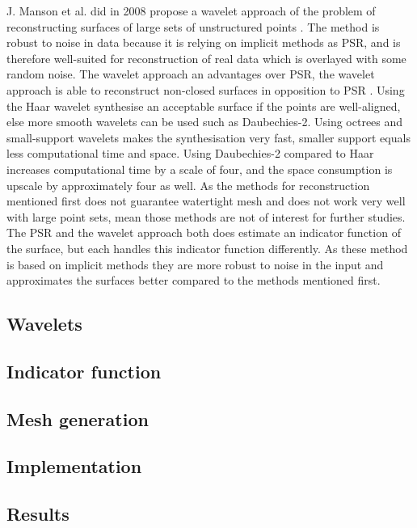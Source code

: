 J. Manson et al. did in 2008 propose a wavelet approach of the problem of reconstructing surfaces of large sets of unstructured points \cite{Manson2008}. The method is robust to noise in data because it is relying on implicit methods as PSR, and is therefore well-suited for reconstruction of real data which is overlayed with some random noise. The wavelet approach an advantages over PSR, the wavelet approach is able to reconstruct non-closed surfaces in opposition to PSR \cite{Kazhdan2006}. Using the Haar wavelet synthesise an acceptable surface if the points are well-aligned, else more smooth wavelets can be used such as Daubechies-2. Using octrees and small-support wavelets makes the synthesisation very fast, smaller support equals less computational time and space. Using Daubechies-2 compared to Haar increases computational time by a scale of four, and the space consumption is upscale by approximately four as well. As the methods for reconstruction mentioned first does not guarantee watertight mesh and does not work very well with large point sets, mean those methods are not of interest for further studies. The PSR and the wavelet approach both does estimate an indicator function of the surface, but each handles this indicator function differently. As these method is based on implicit methods they are more robust to noise in the input and approximates the surfaces better compared to the methods mentioned first.

\subsection{Wavelets}

\subsection{Indicator function}

\subsection{Mesh generation}

\subsection{Implementation}

\subsection{Results}